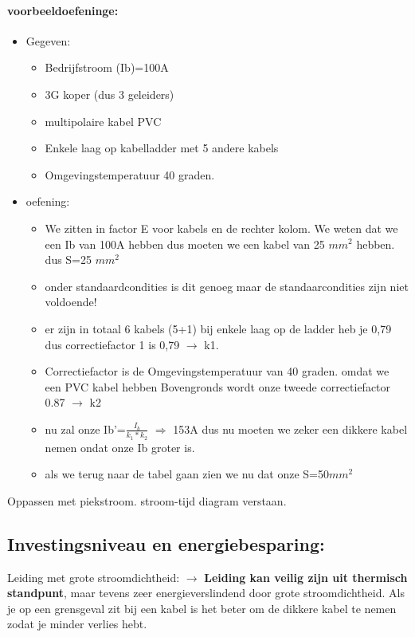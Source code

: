 \documentclass[12pt]{article}
\begin{document}
\paragraph{voorbeeldoefeninge:}
\begin{itemize}
    \item Gegeven:\begin{itemize}
        \item Bedrijfstroom (Ib)=100A
        \item 3G koper (dus 3 geleiders)
        \item multipolaire kabel PVC
        \item Enkele laag op kabelladder met 5 andere kabels
        \item Omgevingstemperatuur 40 graden.
    \end{itemize}
    \item oefening:\begin{itemize}
        \item We zitten in factor E voor kabels en de rechter kolom. We weten dat we een Ib van 100A hebben dus moeten we een kabel van 25 $mm^2$ hebben. dus S=25 $mm^2$ 
        \item onder standaardcondities is dit genoeg maar de standaarcondities zijn niet voldoende!
        \item er zijn in totaal 6 kabels (5+1) bij enkele laag op de ladder heb je 0,79 dus correctiefactor 1 is 0,79 $\rightarrow$ k1. 
        \item Correctiefactor is de Omgevingstemperatuur van 40 graden. omdat we een PVC kabel hebben Bovengronds wordt onze tweede correctiefactor 0.87 $\rightarrow$ k2
        \item nu zal onze Ib'=$\frac{I_b}{k_1*k_2}$ $\Rightarrow$ 153A dus nu moeten we zeker een dikkere kabel nemen ondat onze Ib groter is.
        \item als we terug naar de tabel gaan zien we nu dat onze S=50$mm^2$
    \end{itemize}
\end{itemize}
Oppassen met piekstroom. stroom-tijd diagram verstaan.
\subsection{Investingsniveau en energiebesparing:}
Leiding met grote stroomdichtheid: $\rightarrow$ \textbf{Leiding kan veilig zijn uit thermisch standpunt}, maar tevens zeer energieverslindend door grote stroomdichtheid. Als je op een grensgeval zit bij een kabel is het beter om de dikkere kabel te nemen zodat je minder verlies hebt.
\end{document}
